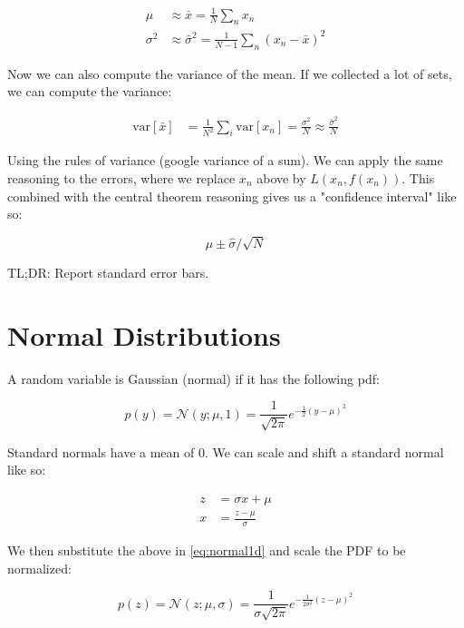 \documentclass{article}
\newcommand{\var}{\text{var}}
\begin{document}
\begin{align*}
    \mu &\approx \bar{x} = \frac{1}{N} \sum_n x_n \\
    \sigma^2 &\approx \bar{\sigma}^2 = \frac{1}{N - 1} \sum_n (x_n - \bar{x})^2
\end{align*}

Now we can also compute the variance of the mean. If we collected a lot of sets, we can compute the variance:

\begin{align}
    \var[\bar{x}] &= \frac{1}{N^2} \sum_i \var[x_n] = \frac{\sigma^2}{N}
        \approx \frac{\bar{\sigma}^2}{N}
\end{align}

Using the rules of variance (google variance of a sum). We can apply the same reasoning to the errors, where we replace $x_n$ above by $L(x_n, f(x_n))$. This combined with the central theorem reasoning gives us a "confidence interval" like so:

\begin{equation}
    \mu \pm \hat{\sigma} / \sqrt{N}
\end{equation}

TL;DR: Report standard error bars.

\section{Normal Distributions}
A random variable is Gaussian (normal) if it has the following pdf:

\begin{equation} \label{eq:normal1d}
    p(y) = \mathcal{N}(y; \mu, 1) = \frac{1}{\sqrt{2 \pi}} e^{-\frac{1}{2}(y - \mu) ^ 2}
\end{equation}

Standard normals have a mean of 0. We can scale and shift a standard normal like so:

\begin{align*}
    z &= \sigma x + \mu \\
    x &= \frac{z - \mu}{\sigma}
\end{align*}

We then substitute the above in \autoref{eq:normal1d} and scale the PDF to be normalized:

\begin{equation}
    p(z) = \mathcal{N}(z; \mu, \sigma) = \frac{1}{\sigma \sqrt{2 \pi}} e^{-\frac{1}{2\sigma^2}(z - \mu) ^ 2}
\end{equation}
\end{document}

